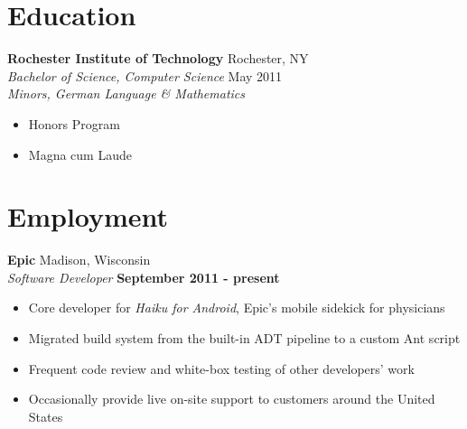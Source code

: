 \documentclass[line,margin]{res}
\begin{document}
 

\address{\url{www.luchenlabs.com}}
\address{bml4633@rit.edu}

                                  
\begin{resume}

\section{\sc Education}          
    \textbf{Rochester Institute of Technology}     \hfill  Rochester, NY  \\        
    \textit{Bachelor of Science, Computer Science} \hfill May 2011    \\
    \textit{Minors, German Language \& Mathematics} 
    \begin{itemize} \itemsep -4pt
        \item Honors Program 
        \item Magna cum Laude 
    \end{itemize}

 
\section{\sc Employment}
    \textbf{Epic} \hfill Madison, Wisconsin  \\
    \textit{Software Developer} \hfill \textbf{September 2011 - present}
    \vspace{0.05in}
    \begin{itemize}
        \item Core developer for \textit{Haiku for Android}, Epic's mobile sidekick for physicians
        \item Migrated build system from the built-in ADT pipeline to a custom Ant script
        \item Frequent code review and white-box testing of other developers' work
        \item Occasionally provide live on-site support to customers around the United States
    \end{itemize}


\end{resume}
\end{document}
